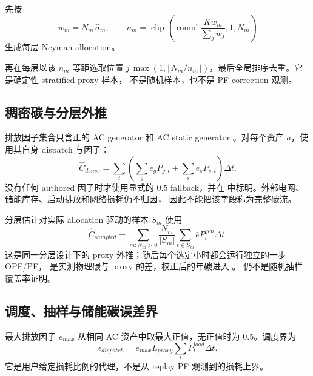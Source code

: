 先按
\begin{equation}
 w_m=N_m\,\hat\sigma_m,\qquad
 n_m=\operatorname{clip}\!\left(\operatorname{round}\frac{K w_m}{\sum_jw_j},1,N_m\right)
\end{equation}
生成每层 Neyman allocation。

 再在每层以该 $n_m$ 等距选取位置
$j\,\max(1,\lfloor N_m/n_m\rfloor)$，最后全局排序去重。它是确定性 stratified proxy
样本，
不是随机样本，也不是 PF correction 观测。

\subsection{稠密碳与分层外推}
排放因子集合只含正的 AC generator  和 AC static generator
。对每个资产 $a$，使用其自身 dispatch 与因子：
\begin{equation}
 \widehat C_{dense}=\sum_t\left(\sum_g e_gP_{g,t}+\sum_s e_sP_{s,t}\right)\Delta t.
\end{equation}
没有任何 authored 因子时才使用显式的 $0.5$ fallback，并在
 中标明。外部电网、储能库存、启动排放和网络损耗仍不归因，
因此不能把该字段称为完整碳流。

分层估计对实际 allocation 驱动的样本 $S_m$ 使用
\begin{equation}
 \widehat C_{sampled}=\sum_{m:N_m>0}
 \frac{N_m}{|S_m|}\sum_{t\in S_m}\bar e P_t^{gen}\Delta t.
\end{equation}
这是同一分层设计下的 proxy 外推；随后每个选定小时都会运行独立的一步 OPF/PF，
 是实测物理碳与 proxy 的差，校正后的年碳进入
。 仍不是随机抽样覆盖率证明。

\subsection{调度、抽样与储能碳误差界}
最大排放因子 $e_{max}$ 从相同 AC 资产中取最大正值，无正值时为 0.5。调度界为
\begin{equation}
 \epsilon_{dispatch}=e_{max}L_{proxy}\sum_tP_t^{load}\Delta t.
\end{equation}
它是用户给定损耗比例的代理，不是从 replay PF 观测到的损耗上界。

